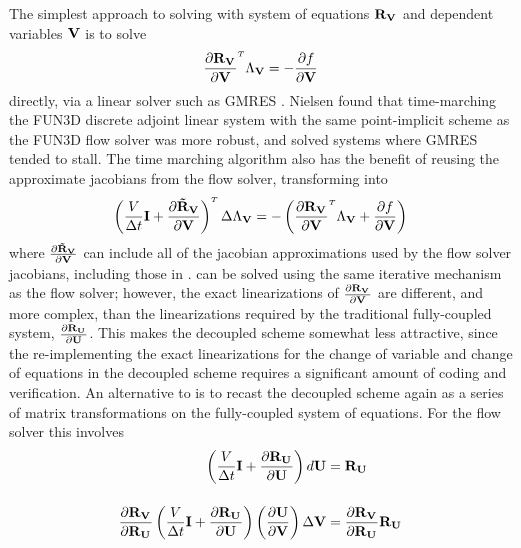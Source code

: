 The simplest approach to solving  with system of equations
$\mathbf R_{{\mathbf V}_{}}$ and dependent variables $\mathbf V$ is to solve
\begin{equation}
  \pd{\rv{}}{\mv}^{\mathsmaller T}\adjlam{\mv} = -\pd{f}{\mv}
  \label{v-adj}
\end{equation}
directly, via a linear solver such as GMRES \cite{saad1986gmres}.  Nielsen
\cite{nielsenPhD} found that time-marching the FUN3D discrete adjoint linear
system with the same point-implicit scheme as the FUN3D flow solver was more
robust, and solved systems where GMRES tended to stall.  The time marching
algorithm also has the benefit of reusing the approximate jacobians from the
flow solver, transforming  into
\begin{equation}
  \left(
    \frac{V}{\Delta t} \mi + \drvdv
  \right)^{\mathsmaller T}
  \Delta \adjlam{\mv}
  =
  -\left(\pd{\rv{}}{\mv}^{\mathsmaller T}\adjlam{\mv} + \pd{f}{\mv} \right)
  \label{v-adj-time}
\end{equation}
where $\frac{\partial \mathbf{\tilde{R}_{\mathbf V}}}{\partial \mathbf V}$ can include all of the jacobian approximations used by the flow
solver jacobians, including those in .
 can be solved using the same iterative mechanism
as the flow solver; however, the exact linearizations of $\frac{\partial \mathbf R_{{\mathbf V}_{}}}{\partial \mathbf V}$
are different, and more complex, than the linearizations required by the
traditional fully-coupled system, $\frac{\partial \mathbf R_{{\mathbf U}_{}}}{\partial \mathbf U}$.  This makes the decoupled
scheme somewhat less attractive, since the re-implementing the exact
linearizations for the change of variable and change of equations in the
decoupled scheme requires a significant amount of coding and verification.  An
alternative to  is to recast the decoupled scheme again as a
series of matrix transformations on the fully-coupled system of equations.  For
the flow solver this involves
\begin{equation}
  \begin{aligned}
    \left( \frac{V}{\Delta t} \mathbf I + \frac{\partial \mathbf R_{{\mathbf U}_{}}}{\partial \mathbf U} \right) d \mathbf U &= \mathbf R_{{\mathbf U}_{}} \\[12pt]
    \frac{\partial \mathbf R_{{\mathbf V}_{}}}{\partial \mathbf R_{{\mathbf U}_{}}}
    \left( \frac{V}{\Delta t} \mathbf I + \frac{\partial \mathbf R_{{\mathbf U}_{}}}{\partial \mathbf U} \right)
    \left( \frac{\partial \mathbf U}{\partial \mathbf V} \right) \Delta \mathbf V
    &= 
    \frac{\partial \mathbf R_{{\mathbf V}_{}}}{\partial \mathbf R_{{\mathbf U}_{}}} \mathbf R_{{\mathbf U}_{}}
  \end{aligned}
  \label{fc-to-dc-flow}
\end{equation}
